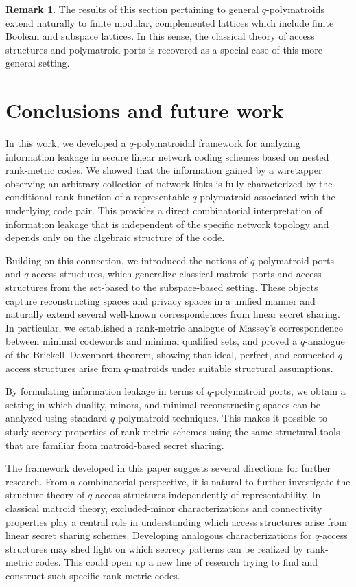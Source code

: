 \documentclass[onecolumn,draftclsnofoot,12pt]{IEEEtran}
\theoremstyle{plain} %
\theoremstyle{definition}
\newtheorem{remark}[theorem]{Remark}
\begin{document}
\begin{remark}
The results of this section pertaining to general $q$-polymatroids extend naturally to finite modular, complemented lattices which include finite Boolean and subspace lattices. In this sense, the classical theory of access structures and polymatroid ports is recovered as a special case of this more general setting.
\end{remark}


\section{Conclusions and future work}
\label{sec:conclusions}

In this work, we developed a $q$-polymatroidal framework for analyzing information leakage in secure linear network coding schemes based on nested rank-metric codes. We showed that the information gained by a wiretapper observing an arbitrary collection of network links is fully characterized by the conditional rank function of a representable $q$-polymatroid associated with the underlying code pair. This provides a direct combinatorial interpretation of information leakage that is independent of the specific network topology and depends only on the algebraic structure of the code.

Building on this connection, we introduced the notions of $q$-polymatroid ports and $q$-access structures, which generalize classical matroid ports and access structures from the set-based to the subspace-based setting. These objects capture reconstructing spaces and privacy spaces in a unified manner and naturally extend several well-known correspondences from linear secret sharing. In particular, we established a rank-metric analogue of Massey’s correspondence between minimal codewords and minimal qualified sets, and proved a $q$-analogue of the Brickell–Davenport theorem, showing that ideal, perfect, and connected $q$-access structures arise from $q$-matroids under suitable structural assumptions.

By formulating information leakage in terms of $q$-polymatroid ports, we obtain a setting in which duality, minors, and minimal reconstructing spaces can be analyzed using standard $q$-polymatroid techniques. This makes it possible to study secrecy properties of rank-metric schemes using the same structural tools that are familiar from matroid-based secret sharing.


The framework developed in this paper suggests several directions for further research. From a combinatorial perspective, it is natural to further investigate the structure theory of $q$-access structures independently of representability. In classical matroid theory, excluded-minor characterizations and connectivity properties play a central role in understanding which access structures arise from linear secret sharing schemes. Developing analogous characterizations for $q$-access structures may shed light on which secrecy patterns can be realized by rank-metric codes. This could open up a new line of research trying to find and construct such specific rank-metric codes. 
\end{document}
